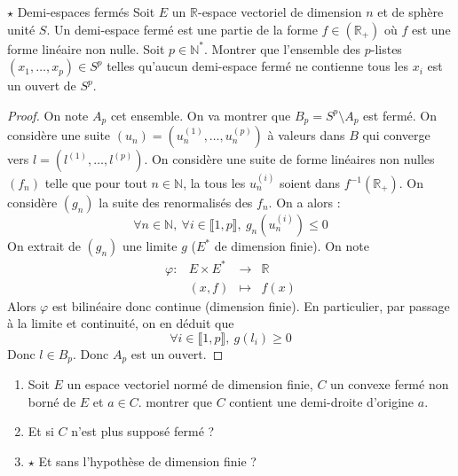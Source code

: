 \documentclass[french,a4paper]{article}
\newcommand{\N}{\mathbb{N}}
\newcommand{\R}{\mathbb{R}}
\newcommand{\st}{^*}
\newcommand{\inv}{^{-1}}
\theoremstyle{plain}
\theoremstyle{definition}
\theoremstyle{remark}
\begin{document}
\begin{ex}[Moulin.06]{$\star$ Demi-espaces fermés}
	Soit $E$ un $\R$-espace vectoriel de dimension $n$ et de sphère unité $S$. Un demi-espace fermé est une partie de la forme $f\in(\R_+)$ où $f$ est une forme linéaire non nulle. Soit $p\in\N\st$. Montrer que l'ensemble des $p$-listes $(x_1,\ldots,x_p)\in S^p$ telles qu'aucun demi-espace fermé ne contienne tous les $x_i$ est un ouvert de $S^p$.
\end{ex}
\begin{proof}
	On note $A_p$ cet ensemble. On va montrer que $B_p=S^p\setminus A_p$ est fermé. On considère une suite $(u_n)=(u_n^{(1)},\ldots,u_n^{(p)})$ à valeurs dans $B$ qui converge vers $l=(l^{(1)},\ldots,l^{(p)})$. On considère une suite de forme linéaires non nulles $(f_n)$ telle que pour tout $n\in\N$, la tous les $u_n^{(i)}$ soient dans $f\inv(\R_+)$. On considère $(g_n)$ la suite des renormalisés des $f_n$. On a alors : $$\forall n\in\N,\ \forall i\in\llbracket1,p\rrbracket,\ g_n(u_n^{(i)})\leqslant 0$$ On extrait de $(g_n)$ une limite $g$ ($E\st$ de dimension finie). On note $$\begin{array}{lrcl}
		\varphi:&E\times E\st&\longrightarrow&\R \\
		&(x,f)&\longmapsto&f(x)
	\end{array}$$ Alors $\varphi$ est bilinéaire donc continue (dimension finie). En particulier, par passage à la limite et continuité, on en déduit que $$\forall i\in\llbracket1,p\rrbracket,\ g(l_i)\geqslant 0$$ Donc $l\in B_p$. Donc $A_p$ est un ouvert.
\end{proof}

\begin{ex}[Moulin.07]{}
	\begin{enumerate}
		\item Soit $E$ un espace vectoriel normé de dimension finie, $C$ un convexe fermé non borné de $E$ et $a\in C$. montrer que $C$ contient une demi-droite d'origine $a$.
		\item Et si $C$ n'est plus supposé fermé ?
		\item $\star$ Et sans l'hypothèse de dimension finie ?
	\end{enumerate}
\end{ex}
\end{document}
